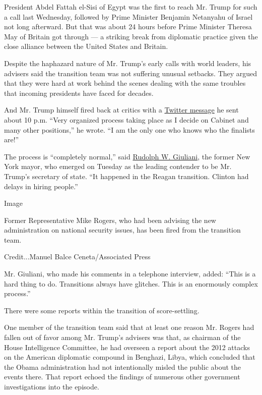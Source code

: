 President Abdel Fattah el-Sisi of Egypt was the first to reach Mr. Trump
for such a call last Wednesday, followed by Prime Minister Benjamin
Netanyahu of Israel not long afterward. But that was about 24 hours
before Prime Minister Theresa May of Britain got through --- a striking
break from diplomatic practice given the close alliance between the
United States and Britain.

Despite the haphazard nature of Mr. Trump's early calls with world
leaders, his advisers said the transition team was not suffering unusual
setbacks. They argued that they were hard at work behind the scenes
dealing with the same troubles that incoming presidents have faced for
decades.

And Mr. Trump himself fired back at critics with a
\href{https://mobile.twitter.com/realDonaldTrump/status/798721142525665280}{Twitter
message} he sent about 10 p.m. ``Very organized process taking place as
I decide on Cabinet and many other positions,'' he wrote. ``I am the
only one who knows who the finalists are!''

The process is ``completely normal,'' said
\href{http://www.nytimes.com/2016/11/16/us/politics/donald-trump-cabinet-rudy-giuliani.html}{Rudolph
W. Giuliani}, the former New York mayor, who emerged on Tuesday as the
leading contender to be Mr. Trump's secretary of state. ``It happened in
the Reagan transition. Clinton had delays in hiring people.''

Image

Former Representative Mike Rogers, who had been advising the new
administration on national security issues, has been fired from the
transition team.

Credit...Manuel Balce Ceneta/Associated Press

Mr. Giuliani, who made his comments in a telephone interview, added:
``This is a hard thing to do. Transitions always have glitches. This is
an enormously complex process.''

There were some reports within the transition of score-settling.

One member of the transition team said that at least one reason Mr.
Rogers had fallen out of favor among Mr. Trump's advisers was that, as
chairman of the House Intelligence Committee, he had overseen a report
about the 2012 attacks on the American diplomatic compound in Benghazi,
Libya, which concluded that the Obama administration had not
intentionally misled the public about the events there. That report
echoed the findings of numerous other government investigations into the
episode.

